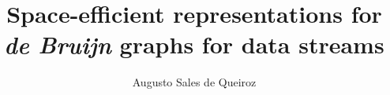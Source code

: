 \documentclass[bsc]{ufpethesis}
\institute{Centro de Informatica}
\author{Augusto Sales de Queiroz}
\title{Space-efficient representations for \emph{de Bruijn} graphs for data streams}
\begin{document}
\frontmatter
    \frontpage
    \presentationpage
\end{document}
